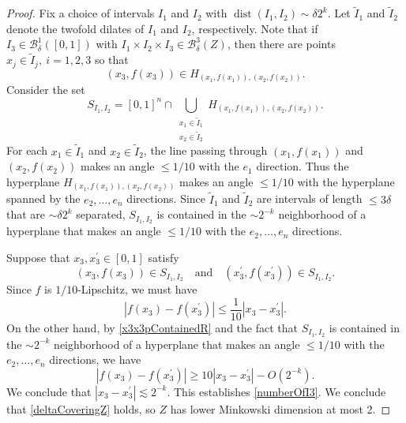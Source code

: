 \begin{proof}
Fix a choice of intervals $I_1$ and $I_2$ with $\operatorname{dist}(I_1,I_2)\sim \delta 2^k$. Let $\tilde I_1$ and $\tilde I_2$ denote the twofold dilates of $I_1$ and $I_2$, respectively. Note that if $I_3\in\mathcal{B}_\delta^1([0,1])$ with $I_1\times I_2\times I_3\in \mathcal{B}_{\delta}^{3}(Z)$, then there are points $x_j\in \tilde I_j,\ i=1,2,3$ so that 
%
\[ (x_3,f(x_3))\in H_{(x_1,f(x_1)), (x_2,f(x_2))}. \]
%
Consider the set
%
\[ S_{I_1,I_2}=[0,1]^n \cap \bigcup_{\substack{x_1\in \tilde I_1\\ x_2\in \tilde I_2}}H_{(x_1,f(x_1)), (x_2,f(x_2))}. \]
%
For each $x_1\in \tilde I_1$ and $x_2\in \tilde I_2$, the line passing through $(x_1,f(x_1))$ and $(x_2,f(x_2))$ makes an angle $\leq 1/10$ with the $e_1$ direction. Thus the hyperplane $H_{(x_1,f(x_1)), (x_2,f(x_2))}$ makes an angle $\leq 1/10$ with the hyperplane spanned by the $e_2,\ldots,e_n$ directions. Since $\tilde I_1$ and $\tilde I_2$ are intervals of length $\leq 3\delta$ that are $\sim \delta 2^k$ separated, $S_{I_1,I_2}$ is contained in the $\sim 2^{-k}$ neighborhood of a hyperplane that makes an angle $\leq 1/10$ with the $e_2,\ldots,e_n$ directions.  

Suppose that $x_3,x_3^\prime\in [0,1]$ satisfy
%
\begin{equation}\label{x3x3pContainedR}
(x_3,f(x_3))\in S_{I_1,I_2}\quad\textrm{and}\quad(x_3^\prime,f(x_3^\prime))\in S_{I_1,I_2}.
\end{equation}
%
Since $f$ is $1/10$-Lipschitz, we must have 
%
\[ |f(x_3)-f(x_3^\prime)|\leq \frac{1}{10}|x_3-x_3^\prime|. \]
%
On the other hand, by \eqref{x3x3pContainedR} and the fact that $S_{I_1,I_2}$ is contained in the $\sim 2^{-k}$ neighborhood of a hyperplane that makes an angle $\leq 1/10$ with the $e_2,\ldots,e_n$ directions, we have
%
\[ |f(x_3)-f(x_3^\prime)|\geq 10|x_3-x_3^\prime|-O(2^{-k}). \]
%
We conclude that $|x_3-x_3^\prime|\lesssim 2^{-k}$. This establishes \eqref{numberOfI3}. We conclude that \eqref{deltaCoveringZ} holds, so $Z$ has lower Minkowski dimension at most 2. 
\end{proof}

\endinput